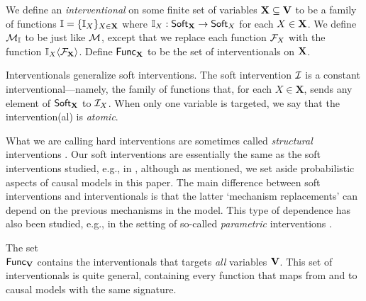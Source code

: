 \documentclass[twoside,11pt]{article}
\begin{document}
\begin{definition}[Interventional] \label{def:interventional}  We define an \textit{interventional} on some finite set of variables $\mathbf{X} \subseteq \mathbf{V}$ to be a family of functions $\mathbb{I} = \{\mathbb{I}_{X}\}_{X \in \mathbf{X}}$ where $ \mathbb{I}_{X}:\mathsf{Soft}_{\mathbf{X}} \to \mathsf{Soft}_{X}$  for each $X \in \mathbf{X}$. %
We define $\mathcal{M}_{\mathbb{I}}$ to be just like $\mathcal{M}$, except that we replace each function $\mathcal{F}_{X}$ with the function $\mathbb{I}_X\langle \mathcal{F}_{\mathbf{X}}\rangle$. Define $\mathsf{Func}_{\mathbf{X}}$ to be the set of interventionals on $\mathbf{X}$.
\end{definition}

Interventionals generalize soft interventions. The soft intervention $\mathcal{I}$ is  a constant interventional---namely, the family of functions that, for each $X \in \mathbf{X}$, sends any element of $\mathsf{Soft}_{\mathbf{X}}$ to $\mathcal{I}_{X}$. When only one variable is targeted, we say that the intervention(al) is \emph{atomic}. 

\begin{remark}[On Terminology] %
What we are calling hard interventions are sometimes called \emph{structural} interventions \citep{EberhardtScheines}. Our soft interventions are essentially the same as the soft interventions studied, e.g., in \cite{Tian2008,BareinboimCorrea}, although as mentioned, we set aside probabilistic aspects of causal models in this paper. The main difference between soft interventions and interventionals is that the latter `mechanism replacements' can depend on the previous mechanisms in the model. This type of dependence has also been studied, e.g., in the setting of so-called \emph{parametric} interventions \citep{EberhardtScheines}. 
\end{remark}

\begin{remark}
The set\\  $\mathsf{Func}_{\mathbf{V}}$ contains the interventionals %
that targets \textit{all} variables $\mathbf{V}$. This set of interventionals is quite general, containing every function that maps from and to causal models with the same signature. 
\end{remark}
\end{document}
